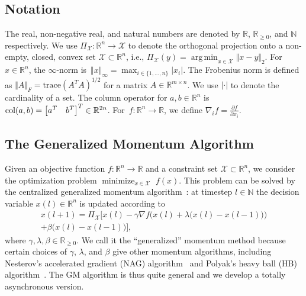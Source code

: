 \documentclass[9pt,shortpaper,twoside,web]{ieeecolor}
\DeclareMathOperator*{\argmin}{arg\,min}
\newcommand{\R}{\ensuremath{\mathbb{R}}\xspace}
\newcommand{\X}{\ensuremath{\mathcal{X}}\xspace}
\newcommand{\col}[2]{\textnormal{col}(#1,#2)}
\begin{document}
\subsection{Notation}

The real, non-negative real, and natural numbers are denoted by $\R$, $\R_{\geq0}$, and $\mathbb{N}$ respectively.
We use $\Pi_{\X}:\R^n\rightarrow\X$ to denote the orthogonal projection onto a non-empty, closed, convex set $\X\subset\R^n$, i.e., $\Pi_\X(y) = \argmin_{x\in \X}\Vert x-y\Vert_2$.
For~$x \in \R^n$, the $\infty$-norm is~$\Vert x \Vert_\infty = \max_{i \in \{1, \ldots, n\}}\vert x_i\vert$. 
The Frobenius norm is defined as $\Vert A\Vert_F = \text{trace}(A^TA)^{1/2}$ for a matrix $A\in\R^{m\times n}$.
We use $\vert \cdot \vert$ to denote the cardinality of a set.
The column operator for $a, b \in \R^n$ is $\col{a}{b}= \begin{bmatrix}
a^T & b^T \end{bmatrix}^T\in \mathbb{R}^{2n}$.
For~$f : \R^n \to \R$, we define
$\nabla_if = \frac{\partial f}{\partial x_i}$.

\subsection{The Generalized Momentum Algorithm}
Given an objective function $f:\R^n\rightarrow \R$ and a constraint set $\X\subset \R^n$, we consider the optimization problem 
$\operatorname{minimize}_{x \in \X} \,\, f(x)$.
This problem can be solved by the centralized generalized momentum algorithm~\cite{cyrus2018}: 
at timestep $l\in\mathbb{N}$ the decision variable $x(l)\in \R^n$ is updated according to 
\begin{multline}\label{eq:centralGMupdate}
    x(l+1) = \Pi_\X \Big[ x(l) - \gamma \nabla f\Big(x(l)+ \lambda\big(x(l)-x(l-1)\big) \Big) 
    \\  + \beta\big(x(l)-x(l-1)\big) \Big],
\end{multline}
where $\gamma,\lambda,\beta\in \R_{\geq0}$.
We call it the ``generalized'' momentum method 
because certain choices of
$\gamma$, $\lambda$, and $\beta$
give other momentum algorithms, including Nesterov's accelerated gradient (NAG) algorithm~\cite{nesterov1983method}
and Polyak's heavy ball (HB) algorithm~\cite{polyak1964some}. 
The GM algorithm is thus quite general
and we develop a totally asynchronous version. 
\end{document}
